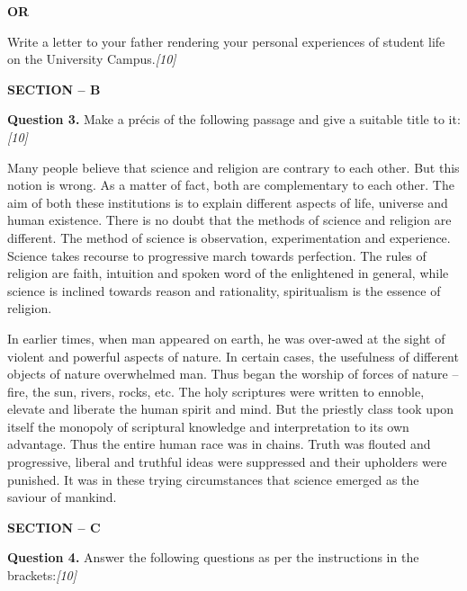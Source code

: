 \documentclass[11pt,a4paper]{article}
\newcommand{\pts}[1]{\hfill   \textit{[#1]}}
\begin{document}
\centerline{   \textbf{OR}}

Write a letter to your father rendering your personal experiences of student life on the University Campus.\pts{10}

\bigskip

\begin{center}
   \textbf{SECTION -- B}
\end{center}




\noindent   \textbf{Question 3.}
Make a précis of the following passage and give a suitable title to it:\pts{10}

Many people believe that science and religion are contrary to each other. But this notion is wrong. As a matter of fact, both are complementary to each other. The aim of both these institutions is to explain different aspects of life, universe and human existence. There is no doubt that the methods of science and religion are different. The method of science is observation, experimentation and experience. Science takes recourse to progressive march towards perfection. The rules of religion are faith, intuition and spoken word of the enlightened in general, while science is inclined towards reason and rationality, spiritualism is the essence of religion.

In earlier times, when man appeared on earth, he was over-awed at the sight of violent and powerful aspects of nature. In certain cases, the usefulness of different objects of nature overwhelmed man. Thus began the worship of forces of nature -- fire, the sun, rivers, rocks, etc. The holy scriptures were written to ennoble, elevate and liberate the human spirit and mind. But the priestly class took upon itself the monopoly of scriptural knowledge and interpretation to its own advantage. Thus the entire human race was in chains. Truth was flouted and progressive, liberal and truthful ideas were suppressed and their upholders were punished. It was in these trying circumstances that science emerged as the saviour of mankind.

\pagebreak

\begin{center}
   \textbf{SECTION -- C}
\end{center}




\noindent   \textbf{Question 4.}
Answer the following questions as per the instructions in the brackets:\pts{10}
\end{document}
